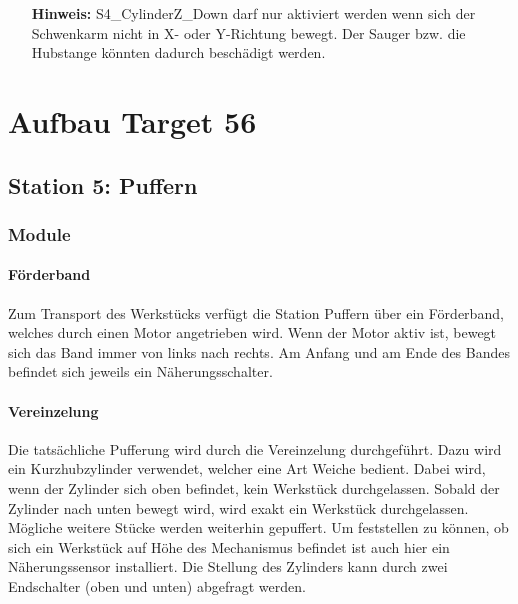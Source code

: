 \documentclass[11pt,a4paper,ngerman]{article}
\begin{document}
\begin{itemize}
	\item[\bf Hinweis:] S4\_CylinderZ\_Down darf nur aktiviert werden wenn sich der Schwenkarm nicht in X- oder Y-Richtung bewegt. Der Sauger bzw. die Hubstange könnten dadurch beschädigt werden.
\end{itemize}


\section{Aufbau Target 56}

\subsection{Station 5: Puffern}

\subsubsection{Module}

\paragraph{Förderband}
Zum Transport des Werkstücks verfügt die Station Puffern über ein Förderband, welches durch einen Motor angetrieben wird. Wenn der Motor aktiv ist, bewegt sich das Band immer von links nach rechts. Am Anfang und am Ende des Bandes befindet sich jeweils ein Näherungsschalter.

\paragraph{Vereinzelung}
Die tatsächliche Pufferung wird durch die Vereinzelung durchgeführt. Dazu wird ein Kurzhubzylinder verwendet, welcher eine Art Weiche bedient. Dabei wird, wenn der Zylinder sich oben befindet, kein Werkstück durchgelassen. Sobald der Zylinder nach unten bewegt wird, wird exakt ein Werkstück durchgelassen. Mögliche weitere Stücke werden weiterhin gepuffert. Um feststellen zu können, ob sich ein Werkstück auf Höhe des Mechanismus befindet ist auch hier ein Näherungssensor installiert. Die Stellung des Zylinders kann durch zwei Endschalter (oben und unten) abgefragt werden.
\end{document}
